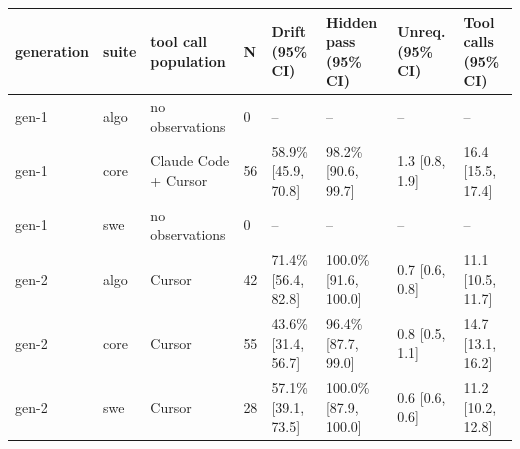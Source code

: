 \begin{tabular}{llllllll}
\toprule
generation & suite & tool call population & N & Drift (95\% CI) & Hidden pass (95\% CI) & Unreq. (95\% CI) & Tool calls (95\% CI) \\
\midrule
gen-1 & algo & no observations & 0 & -- & -- & -- & -- \\
gen-1 & core & Claude Code + Cursor & 56 & 58.9\% [45.9, 70.8] & 98.2\% [90.6, 99.7] & 1.3 [0.8, 1.9] & 16.4 [15.5, 17.4] \\
gen-1 & swe & no observations & 0 & -- & -- & -- & -- \\
gen-2 & algo & Cursor & 42 & 71.4\% [56.4, 82.8] & 100.0\% [91.6, 100.0] & 0.7 [0.6, 0.8] & 11.1 [10.5, 11.7] \\
gen-2 & core & Cursor & 55 & 43.6\% [31.4, 56.7] & 96.4\% [87.7, 99.0] & 0.8 [0.5, 1.1] & 14.7 [13.1, 16.2] \\
gen-2 & swe & Cursor & 28 & 57.1\% [39.1, 73.5] & 100.0\% [87.9, 100.0] & 0.6 [0.6, 0.6] & 11.2 [10.2, 12.8] \\
\bottomrule
\end{tabular}
